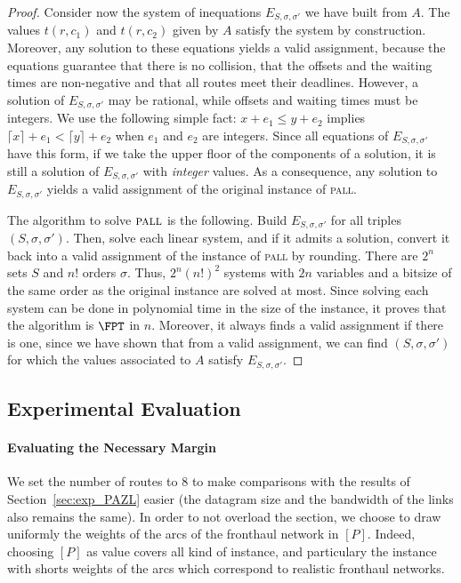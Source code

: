 \documentclass[a4paper,10pt]{journal}
\newcommand\pall{\textsc{pall}\xspace}
\begin{document}
\begin{proof}
Consider now the system of inequations $E_{S,\sigma,\sigma'}$ we have built from $A$.
The values $t(r,c_1)$ and $t(r,c_2)$ given by $A$ satisfy the system by construction. 
Moreover, any solution to these equations yields a valid assignment, because the equations guarantee 
that there is no collision, that the offsets and the waiting times are non-negative and that all routes meet their deadlines. However, a solution of $E_{S,\sigma,\sigma'}$ may be rational, while offsets and waiting times must be integers. We use the following simple fact: $x + e_1 \leq y + e_2$ implies $\lceil x \rceil + e_1 < \lceil y \rceil + e_2$ when $e_1$ and $e_2$ are integers. Since all equations of $E_{S,\sigma,\sigma'}$ have this form, if we take the upper floor of the components of a solution, it is still a solution of $E_{S,\sigma,\sigma'}$ with \emph{integer} values. As a consequence, any solution to $E_{S,\sigma,\sigma'}$ yields a valid assignment of the original instance of \pall.

The algorithm to solve $\pall$ is the following. Build $E_{S,\sigma,\sigma'}$ for all triples $(S,\sigma,\sigma')$. Then, solve each linear system, and if it admits a solution, convert it back into a
valid assignment of the instance of \pall by rounding. There are $2^n$ sets $S$ and $n!$ orders $\sigma$. Thus, $2^n(n!)^2$ systems with $2n$ variables and a bitsize of the same order as the original instance are solved at most. Since solving each system can be done in polynomial time in the size of the instance, it proves that the algorithm is $\FPT$ in $n$. Moreover, it always finds a valid assignment if there is one, since we have shown that from a valid assignment, we can find $(S,\sigma,\sigma')$ for which the values associated to $A$ satisfy $E_{S,\sigma,\sigma'}$.
\end{proof}


    \subsection{Experimental Evaluation}
    \label{sec:resultsPALL}

    \paragraph{Evaluating the Necessary Margin}
    
    We set the number of routes to $8$ to make comparisons with the results of Section~\ref{sec:exp_PAZL} easier (the datagram size and the bandwidth of the links also remains the same). In order to not overload the section, we choose to draw uniformly the weights of the arcs of the fronthaul network in $[P]$. Indeed, choosing $[P]$ as value covers all kind of instance, and particulary the instance with shorts weights of the arcs which correspond to realistic fronthaul networks.
\end{document}
